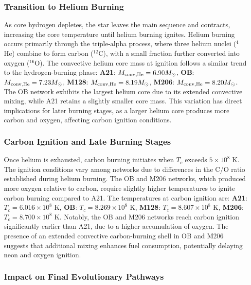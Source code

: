 \subsubsection{Transition to Helium Burning}

As core hydrogen depletes, the star leaves the main sequence and contracts, increasing the core temperature until helium burning ignites. Helium burning occurs primarily through the triple-alpha process, where three helium nuclei ($^4$He) combine to form carbon ($^{12}$C), with a small fraction further converted into oxygen ($^{16}$O). The convective helium core mass at ignition follows a similar trend to the hydrogen-burning phase: \textbf{A21}: $M_{\rm conv, He} = 6.90 M_\odot$, \textbf{OB}: $M_{\rm conv, He} = 7.23 M_\odot$, \textbf{M128}: $M_{\rm conv, He} = 8.19 M_\odot$, \textbf{M206}: $M_{\rm conv, He} = 8.20 M_\odot$. The OB network exhibits the largest helium core due to its extended convective mixing, while A21 retains a slightly smaller core mass. This variation has direct implications for later burning stages, as a larger helium core produces more carbon and oxygen, affecting carbon ignition conditions.

\subsubsection{Carbon Ignition and Late Burning Stages}

Once helium is exhausted, carbon burning initiates when $T_c$ exceeds $5 \times 10^8$ K. The ignition conditions vary among networks due to differences in the C/O ratio established during helium burning. The OB and M206 networks, which produced more oxygen relative to carbon, require slightly higher temperatures to ignite carbon burning compared to A21. The temperatures at carbon ignition are: \textbf{A21}: $T_c = 6.016 \times 10^8$ K, \textbf{OB}: $T_c = 8.269 \times 10^8$ K, \textbf{M128}: $T_c = 8.607 \times 10^8$ K, \textbf{M206}: $T_c = 8.700 \times 10^8$ K. Notably, the OB and M206 networks reach carbon ignition significantly earlier than A21, due to a higher accumulation of oxygen. The presence of an extended convective carbon-burning shell in OB and M206 suggests that additional mixing enhances fuel consumption, potentially delaying neon and oxygen ignition.

\subsubsection{Impact on Final Evolutionary Pathways}

